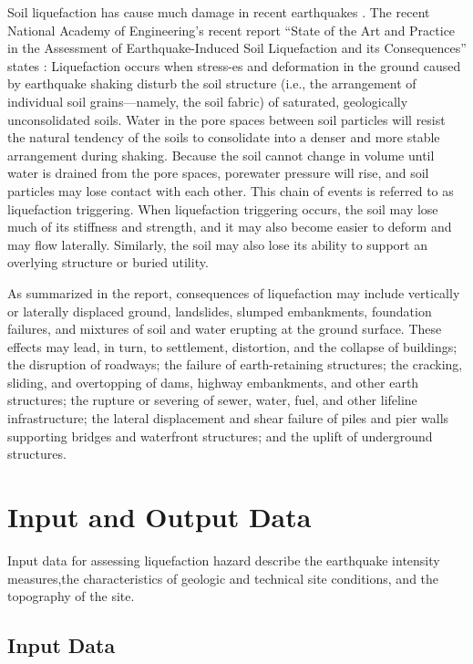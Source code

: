 Soil liquefaction has cause much damage in recent earthquakes \citep[e.g.][]{cubrinovski2011geotechnical,cubrinovski2017liquefaction,bray2017new}. The recent National Academy of Engineering’s recent report ``State of the Art and Practice in the Assessment of Earthquake-Induced Soil Liquefaction and its Consequences'' states \citep{national2016state}: Liquefaction occurs when stress-es and deformation in the ground caused by earthquake shaking disturb the soil structure (i.e., the arrangement of individual soil grains—namely, the soil fabric) of saturated, geologically unconsolidated soils. Water in the pore spaces between soil particles will resist the natural tendency of the soils to consolidate into a denser and more stable arrangement during shaking. Because the soil cannot change in volume until water is drained from the pore spaces, porewater pressure will rise, and soil particles may lose contact with each other. This chain of events is referred to as liquefaction triggering. When liquefaction triggering occurs, the soil may lose much of its stiffness and strength, and it may also become easier to deform and may flow laterally. Similarly, the soil may also lose its ability to support an overlying structure or buried utility. 

As summarized in the \cite{national2016state} report, consequences of liquefaction may include vertically or laterally displaced ground, landslides, slumped embankments, foundation failures, and mixtures of soil and water erupting at the ground surface. These effects may lead, in turn, to settlement, distortion, and the collapse of buildings; the disruption of roadways; the failure of earth-retaining structures; the cracking, sliding, and overtopping of dams, highway embankments, and other earth structures; the rupture or severing of sewer, water, fuel, and other lifeline infrastructure; the lateral displacement and shear failure of piles and pier walls supporting bridges and waterfront structures; and the uplift of underground structures.

\section{Input and Output Data}

Input data for assessing liquefaction hazard describe the earthquake intensity measures,the characteristics of geologic and technical site conditions, and the topography of the site.

\subsection{Input Data}
\label{subsec:eq_liquefaction_input}

